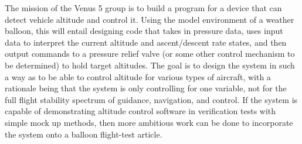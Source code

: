\documentclass[12pt]{article}
\begin{document}
The mission of the Venus 5 group is to build a program for a device that can detect vehicle altitude and control it. Using the model environment of a weather balloon, this will entail designing code that takes in pressure data, uses input data to interpret the current altitude and ascent/descent rate states, and then output commands to a pressure relief valve (or some other control mechanism to be determined) to hold target altitudes. The goal is to design the system in such a way as to be able to control altitude for various types of aircraft, with a rationale being that the system is only controlling for one variable, not for the full flight stability spectrum of guidance, navigation, and control. If the system is capable of demonstrating altitude control software in verification tests with simple mock up methods, then more ambitious work can be done to incorporate the system onto a balloon flight-test article.


\printbibliography[heading=subbibintoc]
%
%
\end{document}
